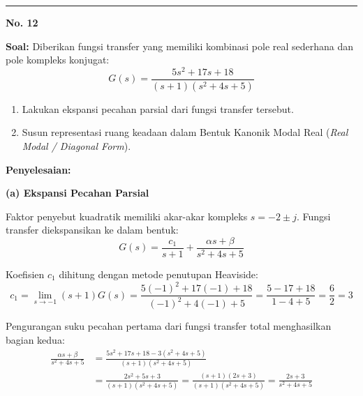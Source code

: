 \documentclass[11pt,a4paper]{article}
\begin{document}
\begin{center}
\end{center}

\vspace{12pt}
\hrule
\vspace{10pt}

\textbf{\large No. 12}

\textbf{Soal:}  
Diberikan fungsi transfer yang memiliki kombinasi pole real sederhana dan pole kompleks konjugat:
$$G(s) = \frac{5s^2 + 17s + 18}{(s + 1)(s^2 + 4s + 5)}$$
\begin{enumerate}[label=(\alph*)]
    \item Lakukan ekspansi pecahan parsial dari fungsi transfer tersebut.
    \item Susun representasi ruang keadaan dalam Bentuk Kanonik Modal Real (\textit{Real Modal / Diagonal Form}).
\end{enumerate}

\textbf{Penyelesaian:}

\textbf{(a) Ekspansi Pecahan Parsial}

Faktor penyebut kuadratik memiliki akar-akar kompleks $s = -2 \pm j$. Fungsi transfer diekspansikan ke dalam bentuk:
$$G(s) = \frac{c_1}{s + 1} + \frac{\alpha s + \beta}{s^2 + 4s + 5}$$

Koefisien $c_1$ dihitung dengan metode penutupan Heaviside:
$$c_1 = \lim_{s \to -1} (s+1) G(s) = \frac{5(-1)^2 + 17(-1) + 18}{(-1)^2 + 4(-1) + 5} = \frac{5 - 17 + 18}{1 - 4 + 5} = \frac{6}{2} = 3$$

Pengurangan suku pecahan pertama dari fungsi transfer total menghasilkan bagian kedua:
\begin{align*}
    \frac{\alpha s + \beta}{s^2 + 4s + 5} &= \frac{5s^2 + 17s + 18 - 3(s^2 + 4s + 5)}{(s+1)(s^2 + 4s + 5)} \\
    &= \frac{2s^2 + 5s + 3}{(s+1)(s^2 + 4s + 5)} = \frac{(s+1)(2s + 3)}{(s+1)(s^2 + 4s + 5)} = \frac{2s + 3}{s^2 + 4s + 5}
\end{align*}
\end{document}
